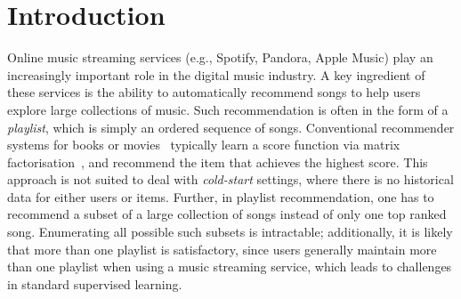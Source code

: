 
\section{Introduction}
\label{sec:intro}
Online music streaming services (e.g., Spotify, Pandora, Apple Music) %
play an increasingly important role in the digital music industry.
A key ingredient of these services is the ability to automatically recommend songs to help users explore large collections of music.
Such recommendation is often in the form of a \emph{playlist}, which is simply an ordered sequence of songs.
%
Conventional recommender systems for books or movies~\citep{Sarwar:2001,Netflix}
typically learn a score function via matrix factorisation~\citep{Koren:2009},
and recommend the item that achieves the highest score.
This approach is not suited to deal with \emph{cold-start} settings,
where there is no historical data for either users or items.
%
Further, in playlist recommendation,
one has to recommend a subset of a large collection of songs instead of only one top ranked song.
Enumerating all possible such subsets is intractable;
additionally,
it is likely that more than one playlist is satisfactory, since
users generally maintain more than one playlist when using a music streaming service,
which leads to challenges in standard supervised learning.


